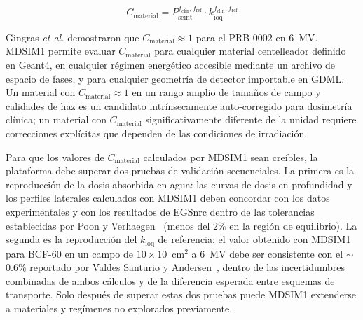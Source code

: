 \documentclass[11pt,a4paper]{article}
\begin{document}
\begin{equation}
C_{\mathrm{material}} = P_{\mathrm{scint}}^{f_{\mathrm{clin}},f_{\mathrm{ref}}} \cdot k_{\mathrm{ioq}}^{f_{\mathrm{clin}},f_{\mathrm{ref}}}
\label{eq:cmaterial}
\end{equation}

Gingras \textit{et al.} demostraron que $C_{\mathrm{material}} \approx 1$ para el PRB-0002 en 6~MV. MDSIM1 permite evaluar $C_{\mathrm{material}}$ para cualquier material centelleador definido en Geant4, en cualquier régimen energético accesible mediante un archivo de espacio de fases, y para cualquier geometría de detector importable en GDML. Un material con $C_{\mathrm{material}} \approx 1$ en un rango amplio de tamaños de campo y calidades de haz es un candidato intrínsecamente auto-corregido para dosimetría clínica; un material con $C_{\mathrm{material}}$ significativamente diferente de la unidad requiere correcciones explícitas que dependen de las condiciones de irradiación.

Para que los valores de $C_{\mathrm{material}}$ calculados por MDSIM1 sean creíbles, la plataforma debe superar dos pruebas de validación secuenciales. La primera es la reproducción de la dosis absorbida en agua: las curvas de dosis en profundidad y los perfiles laterales calculados con MDSIM1 deben concordar con los datos experimentales y con los resultados de EGSnrc dentro de las tolerancias establecidas por Poon y Verhaegen~\cite{poon2005} (menos del 2\% en la región de equilibrio). La segunda es la reproducción del $k_{\mathrm{ioq}}$ de referencia: el valor obtenido con MDSIM1 para BCF-60 en un campo de $10 \times 10$~cm$^{2}$ a 6~MV debe ser consistente con el $\sim$0.6\% reportado por Valdes Santurio y Andersen~\cite{santurio2019}, dentro de las incertidumbres combinadas de ambos cálculos y de la diferencia esperada entre esquemas de transporte. Solo después de superar estas dos pruebas puede MDSIM1 extenderse a materiales y regímenes no explorados previamente.

\end{document}

